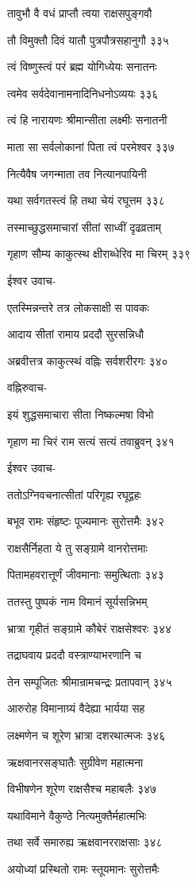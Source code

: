 तावुभौ वै वधं प्राप्तौ त्वया राक्षसपुङ्गवौ

तौ विमुक्तौ दिवं यातौ पुत्रपौत्रसहानुगौ ३३५

त्वं विष्णुस्त्वं परं ब्रह्म योगिध्येयः सनातनः

त्वमेव सर्वदेवानामनादिनिधनोऽव्ययः ३३६

त्वं हि नारायणः श्रीमान्सीता लक्ष्मीः सनातनी

माता सा सर्वलोकानां पिता त्वं परमेश्वर ३३७

नित्यैवैष जगन्माता तव नित्यानपायिनी

यथा सर्वगतस्त्वं हि तथा चेयं रघूत्तम ३३८

तस्माच्छुद्धसमाचारां सीतां साध्वीं दृढव्रताम्

गृहाण सौम्य काकुत्स्थ क्षीराब्धेरिव मा चिरम् ३३९

ईश्वर उवाच-

एतस्मिन्नन्तरे तत्र लोकसाक्षी स पावकः

आदाय सीतां रामाय प्रददौ सुरसन्निधौ

अब्रवीत्तत्र काकुत्स्थं वह्निः सर्वशरीरगः ३४०

वह्निरुवाच-

इयं शुद्धसमाचारा सीता निष्कल्मषा विभो

गृहाण मा चिरं राम सत्यं सत्यं तवाब्रुवन् ३४१

ईश्वर उवाच-

ततोऽग्निवचनात्सीतां परिगृह्य रघूद्वहः

बभूव रामः संहृष्टः पूज्यमानः सुरोत्तमैः ३४२

राक्षसैर्निहता ये तु सङ्ग्रामे वानरोत्तमाः

पितामहवरात्तूर्णं जीवमानाः समुत्थिताः ३४३

ततस्तु पुष्पकं नाम विमानं सूर्यसन्निभम्

भ्रात्रा गृहीतं सङ्ग्रामे कौबेरं राक्षसेश्वरः ३४४

तद्राघवाय प्रददौ वस्त्राण्याभरणानि च

तेन सम्पूजितः श्रीमान्रामचन्द्रः प्रतापवान् ३४५

आरुरोह विमानाग्र्यं वैदेह्या भार्यया सह

लक्ष्मणेन च शूरेण भ्रात्रा दशरथात्मजः ३४६

ऋक्षवानरसङ्घातैः सुग्रीवेण महात्मना

विभीषणेन शूरेण राक्षसैश्च महाबलैः ३४७

यथाविमाने वैकुण्ठे नित्यमुक्तैर्महात्मभिः

तथा सर्वे समारुह्य ऋक्षवानरराक्षसाः ३४८

अयोध्यां प्रस्थितो रामः स्तूयमानः सुरोत्तमैः


